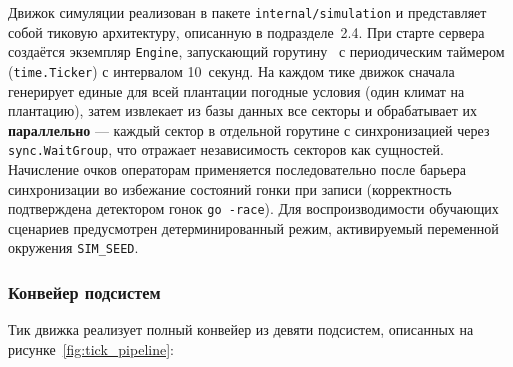 Движок симуляции реализован в пакете \texttt{internal/simulation}
и представляет собой тиковую архитектуру, описанную в
подразделе~2.4. При старте сервера создаётся экземпляр
\texttt{Engine}, запускающий горутину~\cite{effective_go} с
периодическим таймером (\texttt{time.Ticker}) с интервалом
10~секунд. На каждом тике движок сначала генерирует единые
для всей плантации погодные условия (один климат на
плантацию), затем извлекает из базы данных все секторы и
обрабатывает их \textbf{параллельно} --- каждый сектор в
отдельной горутине с синхронизацией через \texttt{sync.WaitGroup},
что отражает независимость секторов как сущностей. Начисление
очков операторам применяется последовательно после барьера
синхронизации во избежание состояний гонки при записи
(корректность подтверждена детектором гонок \texttt{go~-race}).
Для воспроизводимости обучающих сценариев предусмотрен
детерминированный режим, активируемый переменной окружения
\texttt{SIM\_SEED}.

\subsubsection{Конвейер подсистем}

Тик движка реализует полный конвейер из
девяти подсистем, описанных на рисунке~\ref{fig:tick_pipeline}:

